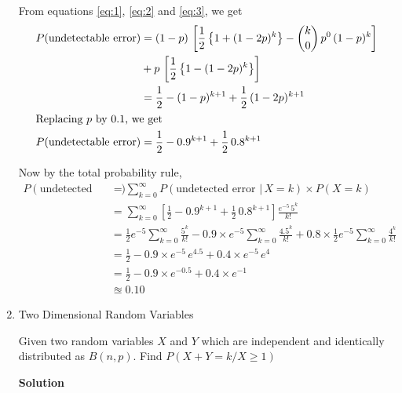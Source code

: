 \documentclass[12pt, oneside]{article}
\begin{document}
\begin{enumerate}
{    From equations \ref{eq:1}, \ref{eq:2} and \ref{eq:3}, we get
    \begin{align*}
        P(\text{undetectable error}) &= (1 - p)\,\left[\frac{1}{2}\left\{1 + (1 - 2p)^k\right\} - 
                {k \choose 0}\,p^0\,(1-p)^k\right] \\
                &+ p\,\left[\frac{1}{2}\left\{1 - (1 - 2p)^k\right\}\right] \\
            &= \frac{1}{2} - (1 - p)^{k + 1} + \frac{1}{2}\,(1 - 2p)^{k+1} \\
        \intertext{Replacing \(p\) by 0.1, we get}
        P(\text{undetectable error}) &= \frac{1}{2} - 0.9^{k + 1} + \frac{1}{2}\,0.8^{k+1}
    \end{align*}

    Now by the total probability rule,
    \begin{align*}
        P(\text{undetected error}) &= \sum_{k = 0}^{\infty} 
                        P(\text{undetected error } |\,X = k) \times P(X = k) \\
            &= \sum_{k = 0}^{\infty} 
                \left[\frac{1}{2} - 0.9^{k + 1} + \frac{1}{2}\,0.8^{k+1}\right]
                \frac{e^{-5}\,5^k}{k!} \\
            &= \frac{1}{2}e^{-5}\sum_{k = 0}^{\infty}\frac{5^k}{k!} 
               - 0.9 \times e^{-5} \sum_{k = 0}^{\infty} \frac{4.5^k}{k!}
               + 0.8 \times \frac{1}{2} e^{-5} \sum_{k = 0}^{\infty} \frac{4^k}{k!} \\
            &= \frac{1}{2} - 0.9 \times e^{-5}\,e^{4.5} + 0.4 \times e^{-5}\,e^{4} \tag*{(Using Taylor series of \(e^x\))}\\
            &= \frac{1}{2} - 0.9 \times e^{-0.5} + 0.4 \times e^{-1} \\
            &\approxeq  0.10
    \end{align*}
}

\item {
    Two Dimensional Random Variables

    Given two random variables \(X\) and \(Y\) which are independent and identically distributed
    as \(B(n, p)\). Find \(P(X + Y = k / X \geq 1)\)

    \textbf{Solution}

}
\end{enumerate}
\end{document}
